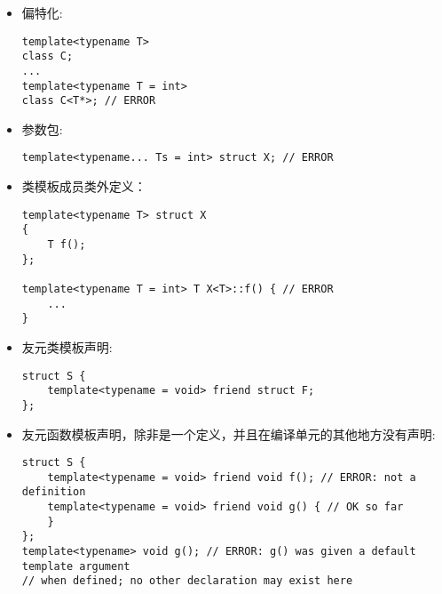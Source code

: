 \begin{itemize}
\item 
偏特化:

\begin{lstlisting}[style=styleCXX]
template<typename T>
class C;
...
template<typename T = int>
class C<T*>; // ERROR
\end{lstlisting}

\item 
参数包:

\begin{lstlisting}[style=styleCXX]
template<typename... Ts = int> struct X; // ERROR
\end{lstlisting}

\item 
类模板成员类外定义：

\begin{lstlisting}[style=styleCXX]
template<typename T> struct X
{
	T f();
};

template<typename T = int> T X<T>::f() { // ERROR
	...
}
\end{lstlisting}

\item 
友元类模板声明:

\begin{lstlisting}[style=styleCXX]
struct S {
	template<typename = void> friend struct F;
};
\end{lstlisting}

\item 
友元函数模板声明，除非是一个定义，并且在编译单元的其他地方没有声明:

\begin{lstlisting}[style=styleCXX]
struct S {
	template<typename = void> friend void f(); // ERROR: not a definition
	template<typename = void> friend void g() { // OK so far
	}
};
template<typename> void g(); // ERROR: g() was given a default template argument
// when defined; no other declaration may exist here
\end{lstlisting}

\end{itemize}















